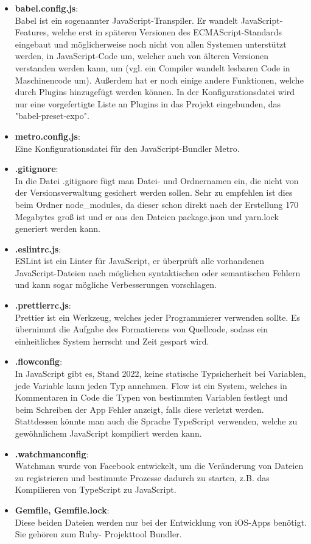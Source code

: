 \begin{itemize}
\item \textbf{babel.config.js}:\\
Babel ist ein sogenannter JavaScript-Transpiler. Er wandelt JavaScript-Features, welche erst in
späteren Versionen des ECMAScript-Standards eingebaut und möglicherweise noch nicht von allen
Systemen unterstützt werden, in JavaScript-Code um, welcher auch von älteren Versionen verstanden
werden kann, um (vgl. ein Compiler wandelt lesbaren Code in Maschinencode um). Außerdem hat er noch
einige andere Funktionen, welche durch Plugins hinzugefügt werden können. In der Konfigurationsdatei
wird nur eine vorgefertigte Liste an Plugins in das Projekt eingebunden, das "babel-preset-expo".

\item \textbf{metro.config.js}:\\
Eine Konfigurationsdatei für den JavaScript-Bundler Metro.

\item \textbf{.gitignore}:\\
In die Datei .gitignore fügt man Datei- und Ordnernamen ein, die nicht von der Versionsverwaltung
gesichert werden sollen. Sehr zu empfehlen ist dies beim Ordner node\_modules, da dieser schon
direkt nach der Erstellung 170 Megabytes groß ist und er aus den Dateien package.json und yarn.lock
generiert werden kann.

\item \textbf{.eslintrc.js}:\\
ESLint ist ein Linter für JavaScript, er überprüft alle vorhandenen JavaScript-Dateien nach
möglichen syntaktischen oder semantischen Fehlern und kann sogar mögliche Verbesserungen vorschlagen.

\item \textbf{.prettierrc.js}:\\
Prettier ist ein Werkzeug, welches jeder Programmierer verwenden sollte. Es übernimmt die Aufgabe
des Formatierens von Quellcode, sodass ein einheitliches System herrscht und Zeit gespart wird.

\item \textbf{.flowconfig}:\\
In JavaScript gibt es, Stand 2022, keine statische Typsicherheit bei Variablen, jede Variable kann
jeden Typ annehmen. Flow ist ein System, welches in Kommentaren in Code die Typen von bestimmten
Variablen festlegt und beim Schreiben der App Fehler anzeigt, falls diese verletzt werden.
Stattdessen könnte man auch die Sprache TypeScript verwenden, welche zu gewöhnlichem JavaScript
kompiliert werden kann.

\item \textbf{.watchmanconfig}:\\
Watchman wurde von Facebook entwickelt, um die Veränderung von Dateien zu registrieren und bestimmte
Prozesse dadurch zu starten, z.B. das Kompilieren von TypeScript zu JavaScript.

\item \textbf{Gemfile, Gemfile.lock}:\\
Diese beiden Dateien werden nur bei der Entwicklung von iOS-Apps benötigt. Sie gehören zum Ruby-
Projekttool Bundler.

\end{itemize}

